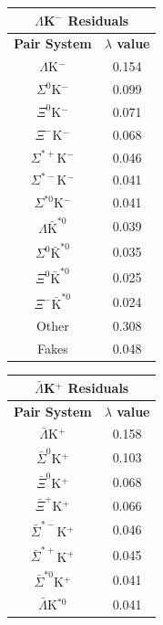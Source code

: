 \documentclass[../AnalysisNoteJBuxton.tex]{subfiles}
\begin{document}
\begin{table}[htbp]
 \centering
 \begin{minipage}{0.3\textwidth}
  \centering 
  \begin{tabular}{|c|c|}
   \multicolumn{2}{c}{$\Lambda$K$^{-}$ Residuals} \\
   \hline
   \textbf{Pair System} & \textbf{$\lambda$ value} \\
   \hline
   $\Lambda$K$^{-}$ & 0.154 \\
   $\Sigma^{0}$K$^{-}$ & 0.099 \\
   $\Xi^{0}$K$^{-}$ & 0.071 \\
   $\Xi^{-}$K$^{-}$ & 0.068 \\
   $\Sigma^{*+}$K$^{-}$ & 0.046 \\
   $\Sigma^{*-}$K$^{-}$ & 0.041 \\
   $\Sigma^{*0}$K$^{-}$ & 0.041 \\
   $\Lambda\bar{\mathrm{K}}^{*0}$ & 0.039 \\
   $\Sigma^{0}\bar{\mathrm{K}}^{*0}$ & 0.035 \\
   $\Xi^{0}\bar{\mathrm{K}}^{*0}$ & 0.025 \\
   $\Xi^{-}\bar{\mathrm{K}}^{*0}$ & 0.024 \\
   Other & 0.308 \\
   Fakes & 0.048 \\
   \hline
  \end{tabular}
 \end{minipage} 
 \begin{minipage}{0.3\textwidth}
  \centering 
  \begin{tabular}{|c|c|}
   \multicolumn{2}{c}{$\bar{\Lambda}$K$^{+}$ Residuals} \\
   \hline
   \textbf{Pair System} & \textbf{$\lambda$ value} \\
   \hline
   $\bar{\Lambda}$K$^{+}$ & 0.158 \\
   $\bar{\Sigma}^{0}$K$^{+}$ & 0.103 \\
   $\bar{\Xi}^{0}$K$^{+}$ & 0.068 \\
   $\bar{\Xi}^{+}$K$^{+}$ & 0.066 \\
   $\bar{\Sigma}^{*-}$K$^{+}$ & 0.046 \\
   $\bar{\Sigma}^{*+}$K$^{+}$ & 0.045 \\
   $\bar{\Sigma}^{*0}$K$^{+}$ & 0.041 \\
   $\bar{\Lambda}$K$^{*0}$ & 0.041 \\

\end{tabular}
\end{minipage}
\end{table}
\end{document}
